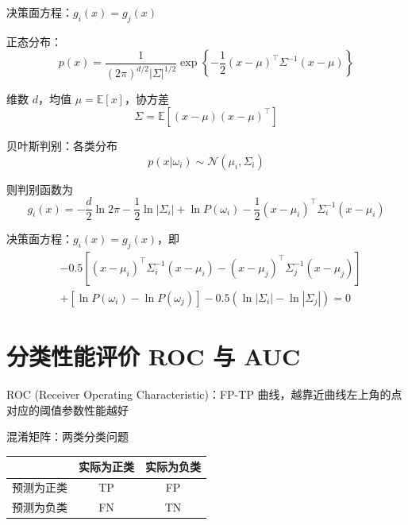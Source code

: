 \documentclass[openany]{ctexbook}
\theoremstyle{kaiti}
\theoremstyle{normal}
\begin{document}
决策面方程：$g_i(x)=g_j(x)$

正态分布：
\begin{equation}
p(x)=\frac{1}{\left(2\pi \right)^{d/2}|\Sigma |^{1/2}}\exp \left\{ -\frac{1}{2}\left(x-\mu \right)^{\top}\Sigma ^{-1}\left(x-\mu \right)\right\}
\end{equation}

维数 $d$，均值 $\mu =\mathbb{E} \left[x \right]$，协方差
\begin{equation}
\Sigma =\mathbb{E} \left[\left(x-\mu \right)\left(x-\mu \right)^{\top} \right]
\end{equation}

贝叶斯判别：各类分布
\begin{equation}
p\left(x|\omega_i \right)\sim \mathcal{N} \left(\mu_i,\Sigma_i \right)
\end{equation}

则判别函数为
\begin{equation}
g_i(x)=-\frac{d}{2}\ln 2\pi -\frac{1}{2}\ln |\Sigma_i|+\ln P\left(\omega_i \right)-\frac{1}{2}\left(x-\mu_i \right)^{\top}\Sigma_{i}^{-1}\left(x-\mu_i \right)
\end{equation}

决策面方程：$g_i(x)=g_j(x)$，即
\begin{equation}
\begin{aligned}
  &-0.5\left[\left(x-\mu_i \right)^{\top}\Sigma_{i}^{-1}\left(x-\mu_i \right)-\left(x-\mu_j \right)^{\top}\Sigma_{j}^{-1}\left(x-\mu_j \right)\right]\\
  &+\left[\ln P\left(\omega_i \right)-\ln P\left(\omega_j \right)\right] -0.5\left(\ln |\Sigma_i|-\ln |\Sigma_j| \right)=0
\end{aligned}
\end{equation}

\section{分类性能评价 ROC 与 AUC}

ROC (Receiver Operating Characteristic)：FP-TP 曲线，越靠近曲线左上角的点对应的阈值参数性能越好

混淆矩阵：两类分类问题

\begin{table}
  \centering
  \begin{tabular}{ccc}
    \hline
           & 实际为正类 & 实际为负类   \\ \hline
     预测为正类 & TP    & FP     \\
     预测为负类 & FN    & TN     \\ \hline
  \end{tabular}
\end{table}
\end{document}
